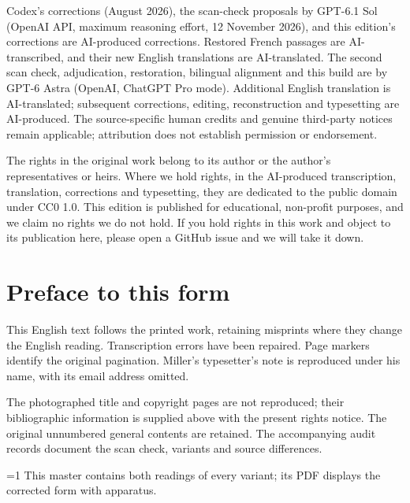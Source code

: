 \documentclass[oneside]{book}
\theoremstyle{sga-source}
\theoremstyle{sga-source-dash}
\theoremstyle{sga-source-dotdash}
\theoremstyle{sga-source-number-note-dash}
\theoremstyle{sga-source-note-number-dotdash}
\theoremstyle{sga-source-example-dotdash}
\theoremstyle{sga-source-inline-number}
\theoremstyle{sga-source-bare-number}
\theoremstyle{sga-source}
\providecommand\EditionIsMaster{1}
\begin{document}
\medskip
Codex’s corrections (August 2026), the scan-check proposals by GPT-6.1 Sol
(OpenAI API, maximum reasoning effort, 12 November 2026), and this edition’s
corrections are AI-produced corrections. Restored French passages are
AI-transcribed, and their new English translations are AI-translated.
The second scan check, adjudication, restoration, bilingual alignment and
this build are by GPT-6 Astra (OpenAI, ChatGPT Pro mode).
Additional English translation is AI-translated; subsequent corrections,
editing, reconstruction and typesetting are AI-produced. The
source-specific human credits and genuine third-party notices remain
applicable; attribution does not establish permission or endorsement.

\medskip
The rights in the original work belong to its author or the author's representatives or heirs.
Where we hold rights, in the AI-produced transcription, translation, corrections and typesetting, they are
dedicated to the public domain under CC0 1.0. This edition is published for educational, non-profit purposes,
and we claim no rights we do not hold. If you hold rights in this work and object to its publication here,
please open a GitHub issue and we will take it down.

\chapter*{Preface to this form}
This English text follows the printed work, retaining misprints
where they change the English reading. Transcription errors have been
repaired. Page markers identify the original pagination. Miller’s
typesetter’s note is reproduced under his name, with its email address
omitted.

The photographed title and copyright pages are not reproduced; their
bibliographic information is supplied above with the present rights
notice. The original unnumbered general contents are retained. The
accompanying audit records document the scan check, variants and source
differences.

\ifnum\EditionIsMaster=1\relax
This master contains both readings of every variant; its PDF displays the corrected form with apparatus.
\fi

\clearpage

\or
\end{document}
